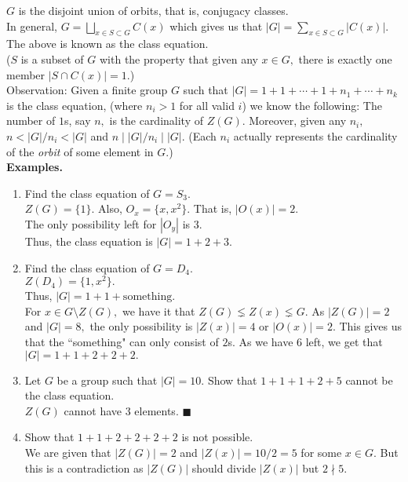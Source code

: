 \documentclass[12 pt, a4paper, toc=graduated, oneside]{article}
\theoremstyle{definition}
\begin{document}
$G$ is the disjoint union of orbits, that is, conjugacy classes.\\
In general, $G = \displaystyle\bigsqcup_{x \in S \subset G}C(x)$ which gives us that $|G| = \displaystyle\sum_{x\in S\subset G}|C(x)|.$\\
The above is known as the class equation.\\
($S$ is a subset of $G$ with the property that given any $x\in G,$ there is exactly one member $|S\cap C(x)| = 1.$)\\
Observation: Given a finite group $G$ such that $|G| = 1 + 1 + \cdots + 1 + n_1 + \cdots + n_k$ is the class equation, (where $n_i > 1$ for all valid $i$) we know the following: The number of $1$s, say $n,$ is the cardinality of $Z(G).$ Moreover, given any $n_i,$ $n < |G|/n_i < |G|$ and $n \mid |G|/n_i \mid |G|.$ (Each $n_i$ actually represents the cardinality of the \emph{orbit} of some element in $G.$)\\
\textbf{Examples.}
\begin{enumerate} 
	\item Find the class equation of $G = S_3.$\\
	$Z(G) = \{1\}.$ Also, $O_x = \{x, x^2\}.$ That is, $|O(x)| = 2.$\\
	The only possibility left for $|O_y|$ is $3.$\\
	Thus, the class equation is $|G| = 1 + 2 + 3.$
	\item Find the class equation of $G = D_4.$\\
	$Z(D_4) = \{1, x^2\}.$\\
	Thus, $|G| = 1 + 1 + \text{something}.$\\
	For $x \in G\setminus Z(G),$ we have it that $Z(G) \lneq Z(x) \lneq G.$ As $|Z(G)| = 2$ and $|G| = 8,$ the only possibility is $|Z(x)| = 4$ or $|O(x)| = 2.$ This gives us that the ``something" can only consist of $2$s. As we have $6$ left, we get that $|G| = 1 + 1 + 2 + 2 + 2.$
	\item Let $G$ be a group such that $|G| = 10.$ Show that $1 + 1 + 1 + 2 + 5$ cannot be the class equation.\\
	$Z(G)$ cannot have 3 elements. \hfill $\blacksquare$
	\item Show that $1 + 1 + 2 + 2 + 2 + 2$ is not possible.\\
	We are given that $|Z(G)| = 2$ and $|Z(x)| = 10/2 = 5$ for some $x \in G.$ But this is a contradiction as $|Z(G)|$ should divide $|Z(x)|$ but $2 \nmid 5.$
\end{enumerate}
\end{document}
